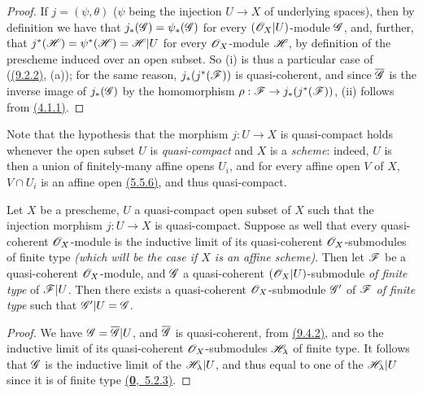 \begin{proof}
\label{proof-prop-1.9.4.2}
If $j=(\psi,\theta)$ ($\psi$ being the injection $U\to X$ of underlying spaces), then by
definition we have that $j_*(\mathscr{G})=\psi_*(\mathscr{G})$ for every $(\mathscr{O}_X|U)$-module $\mathscr{G}$,
and, further, that $j^*(\mathscr{H})=\psi^*(\mathscr{H})=\mathscr{H}|U$ for every $\mathscr{O}_X$-module $\mathscr{H}$,
by definition of the prescheme induced over an open subset. So (i) is thus a particular case
of (\hyperref[cor-1.9.2.2]{(9.2.2)}, (a)); for the same reason, $j_*(j^*(\mathscr{F}))$ is quasi-coherent, and
since $\overline{\mathscr{G}}$ is the inverse image of $j_*(\mathscr{G})$ by the homomorphism
$\rho:\mathscr{F}\to j_*(j^*(\mathscr{F}))$, (ii) follows from \hyperref[env-1.4.1.1]{(4.1.1)}.
\end{proof}

Note that the hypothesis that the morphism $j:U\to X$ is quasi-compact
holds whenever the open subset $U$ is {\em quasi-compact} and $X$ is a
{\em scheme}: indeed, $U$ is then a union of finitely-many affine opens $U_i$,
and for every affine open $V$ of $X$, $V\cap U_i$ is an affine open \hyperref[env-1.5.5.6]{(5.5.6)}, and
thus quasi-compact.

\begin{cor}[9.4.3]
\label{cor-1.9.4.3}
Let $X$ be a prescheme, $U$ a quasi-compact open subset of $X$ such that the injection
morphism $j:U\to X$ is quasi-compact. Suppose as well that every quasi-coherent
$\mathscr{O}_X$-module is the inductive limit of its quasi-coherent $\mathscr{O}_X$-submodules of finite type
{\em (which will be the case if $X$ is an {\em affine scheme})}. Then let $\mathscr{F}$ be a
quasi-coherent $\mathscr{O}_X$-module, and $\mathscr{G}$ a quasi-coherent $(\mathscr{O}_X|U)$-submodule {\em of
finite type} of $\mathscr{F}|U$. Then there exists a quasi-coherent $\mathscr{O}_X$-submodule $\mathscr{G}'$ of
$\mathscr{F}$ {\em of finite type} such that $\mathscr{G}'|U=\mathscr{G}$.
\end{cor}

\begin{proof}
\label{proof-cor-1.9.4.3}
We have $\mathscr{G}=\overline{\mathscr{G}}|U$, and $\overline{\mathscr{G}}$ is quasi-coherent, from
\hyperref[prop-1.9.4.2]{(9.4.2)}, and so the inductive limit of its quasi-coherent $\mathscr{O}_X$-submodules
$\mathscr{H}_\lambda$ of finite type. It follows that $\mathscr{G}$ is the inductive limit of the
$\mathscr{H}_\lambda|U$, and thus equal to one of the $\mathscr{H}_\lambda|U$ since it is of finite
type \hyperref[env-0.5.2.3]{(\textbf{0},~5.2.3)}.
\end{proof}


